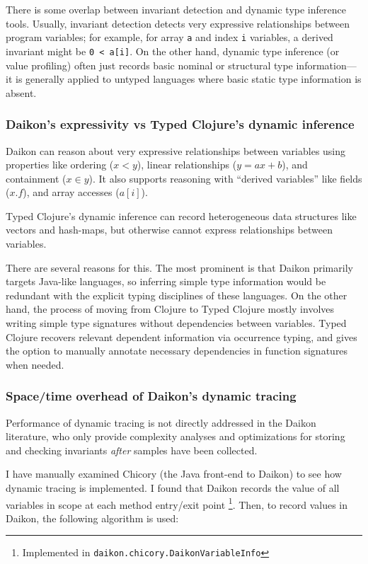 There is some overlap between invariant detection and dynamic type inference
tools. Usually, invariant detection detects very expressive relationships
between program variables; for example, for array \texttt{a} and index
\texttt{i} variables, a derived invariant might be \texttt{0 < a[i]}.
On the other hand, dynamic type inference (or value profiling) often just records
basic nominal or structural type information---it is generally applied to untyped
languages where basic static type information is absent.

\subsubsection{Daikon's expressivity vs Typed Clojure's dynamic inference}

Daikon can reason about very expressive relationships between variables
using properties like ordering ($x < y$), linear relationships ($y = ax + b$),
and containment ($x \in y$). It also supports reasoning with ``derived variables''
like fields ($x.f$), and array accesses ($a[i]$).

Typed Clojure's dynamic inference can record heterogeneous data structures
like vectors and hash-maps, but otherwise cannot express relationships
between variables.

There are several reasons for this. The most prominent is that Daikon
primarily targets Java-like languages, so inferring simple type information
would be redundant with the explicit typing disciplines of these languages.
On the other hand, the process of moving from Clojure to Typed Clojure
mostly involves writing simple type signatures without dependencies
between variables. Typed Clojure recovers relevant dependent information
via occurrence typing, and gives the option to manually annotate necessary
dependencies in function signatures when needed.

\subsubsection{Space/time overhead of Daikon's dynamic tracing}

Performance of dynamic tracing is not directly addressed in the Daikon
literature, who only provide complexity analyses and optimizations for storing
and checking invariants \emph{after} samples have been collected.

I have manually examined Chicory (the Java front-end to Daikon) to see how
dynamic tracing is implemented.
I found that Daikon records the value of all variables in scope
at each method entry/exit point \footnote{Implemented in \texttt{daikon.chicory.DaikonVariableInfo}}.
Then, to record values in Daikon, the following algorithm is used:

